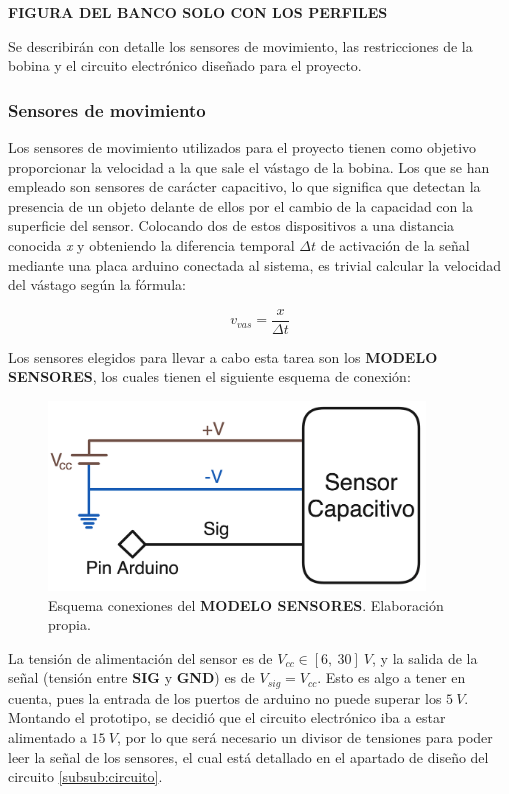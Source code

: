 \textbf{FIGURA DEL BANCO SOLO CON LOS PERFILES}

Se describirán con detalle los sensores de movimiento, las restricciones de la bobina y el circuito electrónico diseñado para el proyecto.

\subsubsection{Sensores de movimiento}
\label{subsub:sensoresmov}

Los sensores de movimiento utilizados para el proyecto tienen como objetivo proporcionar la velocidad a la que sale el vástago de la bobina. Los que se han empleado son sensores de carácter capacitivo, lo que significa que detectan la presencia de un objeto delante de ellos por el cambio de la capacidad con la superficie del sensor. Colocando dos de estos dispositivos a una distancia conocida \textit{x} y obteniendo la diferencia temporal \(\Delta t\) de activación de la señal mediante una placa arduino conectada al sistema, es trivial calcular la velocidad del vástago según la fórmula:

\[v_{vas}=\frac{x}{\Delta t}\]

Los sensores elegidos para llevar a cabo esta tarea son los \textbf{MODELO SENSORES}, los cuales tienen el siguiente esquema de conexión:

\begin{figure}[H]
    \centering
    \includegraphics[width=10cm]{FigurasMemoria/esquemaSensor.png}
    \caption{Esquema conexiones del \textbf{MODELO SENSORES}. Elaboración propia.}
    \label{fig:esquemaSensor} %
\end{figure}

La tensión de alimentación del sensor es de \(V_{cc}\in [6,~30]~V\), y la salida de la señal (tensión entre \textbf{SIG} y \textbf{GND}) es de \(V_{sig}=V_{cc}\). Esto es algo a tener en cuenta, pues la entrada de los puertos de arduino no puede superar los \(5~V\). Montando el prototipo, se decidió que el circuito electrónico iba a estar alimentado a \(15~V\), por lo que será necesario un divisor de tensiones para poder leer la señal de los sensores, el cual está detallado en el apartado de diseño del circuito \ref{subsub:circuito}.


